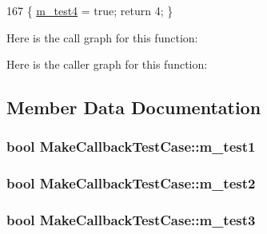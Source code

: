 \begin{DoxyCode}
167 \{ \hyperlink{classMakeCallbackTestCase_ad9e356702447a8d7afb93fbe0ca6c94f}{m\_test4} = \textcolor{keyword}{true}; \textcolor{keywordflow}{return} 4; \}
\end{DoxyCode}


Here is the call graph for this function\+:




Here is the caller graph for this function\+:




\subsection{Member Data Documentation}
\subsubsection[{\texorpdfstring{m\+\_\+test1}{m_test1}}]{\setlength{\rightskip}{0pt plus 5cm}bool Make\+Callback\+Test\+Case\+::m\+\_\+test1\hspace{0.3cm}{\ttfamily [private]}}\hypertarget{classMakeCallbackTestCase_a66b6af95072f94d66be7c35f67525f02}{}\label{classMakeCallbackTestCase_a66b6af95072f94d66be7c35f67525f02}
\subsubsection[{\texorpdfstring{m\+\_\+test2}{m_test2}}]{\setlength{\rightskip}{0pt plus 5cm}bool Make\+Callback\+Test\+Case\+::m\+\_\+test2\hspace{0.3cm}{\ttfamily [private]}}\hypertarget{classMakeCallbackTestCase_ac51832a1dad4c4161665aa06eeb35e0e}{}\label{classMakeCallbackTestCase_ac51832a1dad4c4161665aa06eeb35e0e}
\subsubsection[{\texorpdfstring{m\+\_\+test3}{m_test3}}]{\setlength{\rightskip}{0pt plus 5cm}bool Make\+Callback\+Test\+Case\+::m\+\_\+test3\hspace{0.3cm}{\ttfamily [private]}}\hypertarget{classMakeCallbackTestCase_afa1e7a6b428e77a5cdeb0cdfb05ef325}{}\label{classMakeCallbackTestCase_afa1e7a6b428e77a5cdeb0cdfb05ef325}

